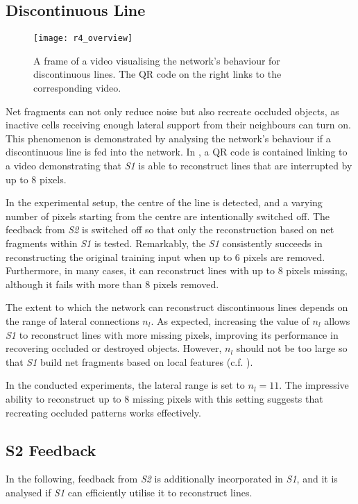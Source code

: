 \subsection{Discontinuous Line}
%
\begin{figure}[h]
    \centering
    \texttt{[image: r4\_overview]}
    \caption[Video visualising the network's behaviour for discontinuous lines]{A frame of a video visualising the network's behaviour for discontinuous lines. The QR code on the right links to the corresponding video.}
\end{figure}
%
Net fragments  can not only reduce noise but also recreate occluded objects, as inactive cells receiving enough lateral support from their neighbours can turn on.
This phenomenon is demonstrated by analysing the network's behaviour if a discontinuous line is fed into the network.
In , a QR code is contained linking to a video demonstrating that \emph{S1} is able to reconstruct lines that are interrupted by up to $8$ pixels.

In the experimental setup, the centre of the line is detected, and a varying number of pixels starting from the centre are intentionally switched off.
The feedback from \emph{S2} is switched off so that only the reconstruction based on net fragments within \emph{S1} is tested.
Remarkably, the \emph{S1} consistently succeeds in reconstructing the original training input when up to $6$ pixels are removed. Furthermore, in many cases, it can reconstruct lines with up to $8$ pixels missing, although it fails with more than $8$ pixels removed.

The extent to which the network can reconstruct discontinuous lines depends on the range of lateral connections $n_l$. As expected, increasing the value of $n_l$ allows \emph{S1} to reconstruct lines with more missing pixels, improving its performance in recovering occluded or destroyed objects.
However, $n_l$ should not be too large so that \emph{S1} build net fragments based on local features (c.f. ).

In the conducted experiments, the lateral range is set to $n_l=11$.
The impressive ability to reconstruct up to $8$ missing pixels with this setting suggests that recreating occluded patterns works effectively.


\subsection{S2 Feedback}
In the following, feedback from \emph{S2} is additionally incorporated in \emph{S1}, and it is analysed if \emph{S1} can efficiently utilise it to reconstruct lines.

